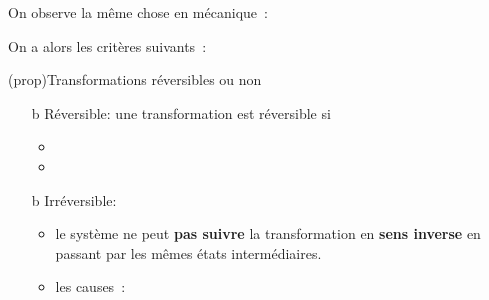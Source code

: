 \documentclass[../../main/main.tex]{subfiles}
\begin{document}
On observe la même chose en mécanique~:

\begin{figure}[htbp]
	\centering
\end{figure}

On a alors les critères suivants~:
\begin{tcb*}(prop){Transformations réversibles ou non}
	\begin{itemize}
		\item[b]{Réversible}: une transformation est réversible si
		\begin{itemize}
			\item {}
			\item {}
		\end{itemize}
		\item[b]{Irréversible}:
		\begin{itemize}
			\item le système ne peut \textbf{pas suivre} la transformation en
			      \textbf{sens inverse} en passant par les mêmes états intermédiaires.
			\item les causes~: 
		\end{itemize}
	\end{itemize}
\end{tcb*}
\end{document}
